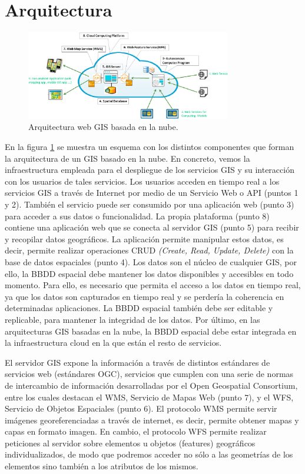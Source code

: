 \section{Arquitectura}

\begin{figure}[H]
  \centering
  \includegraphics[width=0.8\textwidth]{Imagenes/GIS/arquitecturaGIS.png}
  \caption{Arquitectura web GIS basada en la nube.} \label{fig:arquitecturaGIS}
\end{figure}

En la figura \ref{fig:arquitecturaGIS} se muestra un esquema con los distintos componentes que forman la arquitectura de un GIS basado en la nube.
En concreto, vemos la infraestructura empleada para el despliegue de los servicios GIS y su interacción con los usuarios de tales servicios.
Los usuarios acceden en tiempo real a los servicios GIS a través de Internet por medio de un Servicio Web o API (puntos 1 y 2).
También el servicio puede ser consumido por una aplicación web (punto 3) para acceder a sus datos o funcionalidad. 
La propia plataforma (punto 8) contiene una aplicación web que se conecta al servidor GIS (punto 5) para recibir y recopilar datos geográficos. 
La aplicación permite manipular estos datos, es decir, permite realizar operaciones CRUD \textit{(Create, Read, Update, Delete)} con la base de datos espaciales (punto 4).
Los datos son el núcleo de cualquier GIS, por ello, la BBDD espacial debe mantener los datos disponibles y accesibles en todo momento.
Para ello, es necesario que permita el acceso a los datos en tiempo real, ya que los datos son capturados en tiempo real y se perdería la coherencia en determinadas aplicaciones.
La BBDD espacial también debe ser editable y replicable, para mantener la integridad de los datos.
Por último, en las arquitecturas GIS basadas en la nube, la BBDD espacial debe estar integrada en la infraestructura cloud en la que están el resto de servicios.

El servidor GIS expone la información a través de distintos estándares de servicios web (estándares OGC), servicios que cumplen con una serie de normas de intercambio de información desarrolladas por el Open Geospatial Consortium,
entre los cuales destacan el WMS, Servicio de Mapas Web (punto 7), y el WFS, Servicio de Objetos Espaciales (punto 6).
El protocolo WMS permite servir imágenes georeferenciadas a través de internet, es decir, permite obtener mapas y capas en formato imagen.
En cambio, el protocolo WFS permite realizar peticiones al servidor sobre elementos u objetos (features) geográficos individualizados,
de modo que podremos acceder no sólo a las geometrías de los elementos sino también a los atributos de los mismos.

